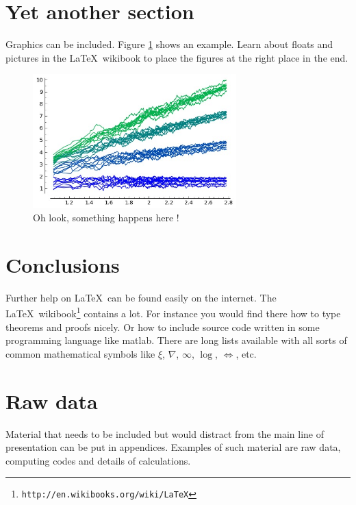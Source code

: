\documentclass{uonmathreport}
\begin{document}
\section{Yet another section} \label{sec:my2}

Graphics can be included. Figure \ref{fig:bsd} shows an example.
Learn about floats and pictures in the \LaTeX\ wikibook to place
the figures at the right place in the end.
%
\begin{figure}
 \begin{center}
   \includegraphics[width=0.7\textwidth]{bsd.jpg}
 \end{center}
 \caption{Oh look, something happens here !}
 \label{fig:bsd}
\end{figure}

\section{Conclusions} \label{sec:conclusions}

Further help on \LaTeX\ can be found easily on the internet. The \LaTeX\
wikibook\footnote{\tt http://en.wikibooks.org/wiki/LaTeX} contains a lot.
For instance you would find there how to type theorems and proofs nicely.
Or how to include source code written in some programming language like
matlab. There are long lists available with all sorts of common
mathematical symbols like $\xi$, $\nabla$, $\infty$, $\log$, $\iff$, etc.

\newpage

\appendix

\section{Raw data} \label{app:rawdata}

Material that needs to be included but would distract from the main
line of presentation can be put in appendices.
Examples of such material are raw
data, computing codes and details of calculations.
\end{document}
